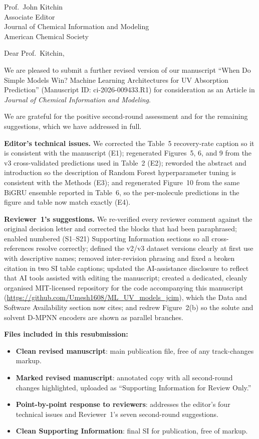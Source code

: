 \documentclass[11pt]{letter}
\begin{document}
\begin{letter}{Prof.\ John Kitchin\\
Associate Editor\\
Journal of Chemical Information and Modeling\\
American Chemical Society}

\opening{Dear Prof.\ Kitchin,}

We are pleased to submit a further revised version of our manuscript ``When Do Simple Models Win? Machine Learning Architectures for UV Absorption Prediction'' (Manuscript ID: ci-2026-009433.R1) for consideration as an Article in \textit{Journal of Chemical Information and Modeling}.

We are grateful for the positive second-round assessment and for the remaining suggestions, which we have addressed in full.

\textbf{Editor's technical issues.} We corrected the Table~5 recovery-rate caption so it is consistent with the manuscript (E1); regenerated Figures~5, 6, and 9 from the v3 cross-validated predictions used in Table~2 (E2); reworded the abstract and introduction so the description of Random Forest hyperparameter tuning is consistent with the Methods (E3); and regenerated Figure~10 from the same BiGRU ensemble reported in Table~6, so the per-molecule predictions in the figure and table now match exactly (E4).

\textbf{Reviewer~1's suggestions.} We re-verified every reviewer comment against the original decision letter and corrected the blocks that had been paraphrased; enabled numbered (S1--S21) Supporting Information sections so all cross-references resolve correctly; defined the v2/v3 dataset versions clearly at first use with descriptive names; removed inter-revision phrasing and fixed a broken citation in two SI table captions; updated the AI-assistance disclosure to reflect that AI tools assisted with editing the manuscript; created a dedicated, cleanly organised MIT-licensed repository for the code accompanying this manuscript (\url{https://github.com/Umesh1608/ML_UV_models_jcim}), which the Data and Software Availability section now cites; and redrew Figure~2(b) so the solute and solvent D-MPNN encoders are shown as parallel branches.

\textbf{Files included in this resubmission:}
\begin{itemize}
\item \textbf{Clean revised manuscript}: main publication file, free of any track-changes markup.
\item \textbf{Marked revised manuscript}: annotated copy with all second-round changes highlighted, uploaded as ``Supporting Information for Review Only.''
\item \textbf{Point-by-point response to reviewers}: addresses the editor's four technical issues and Reviewer~1's seven second-round suggestions.
\item \textbf{Clean Supporting Information}: final SI for publication, free of markup.
\end{itemize}


\end{letter}
\end{document}
